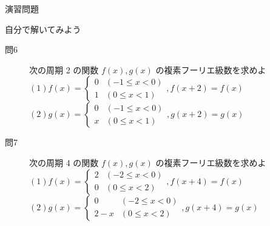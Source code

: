 \documentclass[professionalfonts]{beamer}
\begin{document}
\begin{frame}{演習問題}
  \begin{exampleblock}{自分で解いてみよう}
  \begin{description}
    \item[問6] 次の周期 2 の関数 $f(x), g(x)$ の複素フーリエ級数を求めよ
    $(1) f(x) = \begin{cases} 0 & (-1 \leq x < 0) \\ 1 & (0 \leq x < 1) \end{cases},  f(x+2) = f(x)$\\
    $(2) g(x) = \begin{cases} 0 & (-1 \leq x < 0) \\ x & (0 \leq x < 1) \end{cases},  g(x+2) = g(x)$\\
    \item[問7] 次の周期 4 の関数 $f(x), g(x)$ の複素フーリエ級数を求めよ
    $(1) f(x) = \begin{cases} 2 & (-2 \leq x < 0) \\ 0 & (0 \leq x < 2) \end{cases},  f(x+4) = f(x)$\\
    $(2) g(x) = \begin{cases} 0 & (-2 \leq x < 0) \\ 2-x & (0 \leq x < 2) \end{cases},  g(x+4) = g(x)$\\
  \end{description}
  \end{exampleblock}
\end{frame}
\end{document}
